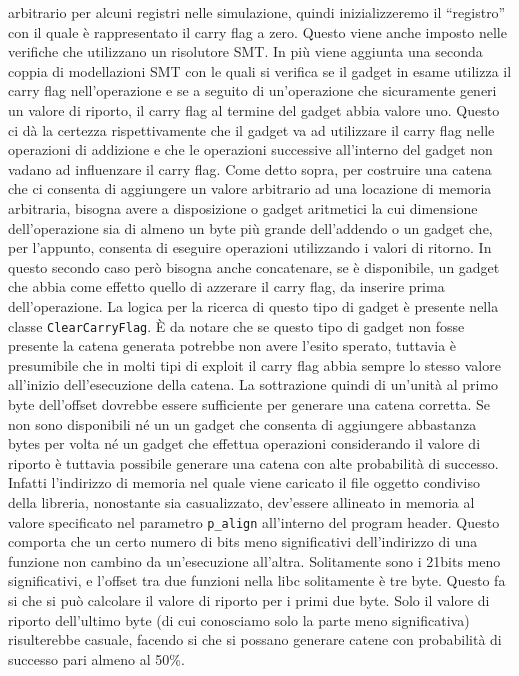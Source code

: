 arbitrario per alcuni registri nelle simulazione, quindi
inizializzeremo il ``registro'' con il quale è rappresentato il carry
flag a zero. Questo viene anche imposto nelle verifiche che utilizzano
un risolutore SMT. In più viene aggiunta una seconda coppia di
modellazioni SMT con le quali si verifica se il gadget in esame
utilizza il carry flag nell'operazione e se a seguito di un'operazione
che sicuramente generi un valore di riporto, il carry flag al termine
del gadget abbia valore uno. Questo ci dà la certezza rispettivamente
che il gadget va ad utilizzare il carry flag nelle operazioni di
addizione e che le operazioni successive all'interno del gadget non
vadano ad influenzare il carry flag. Come detto sopra, per costruire
una catena che ci consenta di aggiungere un valore arbitrario ad una
locazione di memoria arbitraria, bisogna avere a disposizione o gadget
aritmetici la cui dimensione dell'operazione sia di almeno un byte più
grande dell'addendo o un gadget che, per l'appunto, consenta di
eseguire operazioni utilizzando i valori di ritorno. In questo secondo
caso però bisogna anche concatenare, se è disponibile, un gadget che
abbia come effetto quello di azzerare il carry flag, da inserire prima
dell'operazione. La logica per la ricerca di questo tipo di gadget è
presente nella classe \lstinline{ClearCarryFlag}. È da notare che se
questo tipo di gadget non fosse presente la catena generata potrebbe
non avere l'esito sperato, tuttavia è presumibile che in molti tipi di
exploit il carry flag abbia sempre lo stesso valore all'inizio
dell'esecuzione della catena. La sottrazione quindi di un'unità al
primo byte dell'offset dovrebbe essere sufficiente per generare una
catena corretta. Se non sono disponibili né un un gadget che consenta
di aggiungere abbastanza bytes per volta né un gadget che effettua
operazioni considerando il valore di riporto è tuttavia possibile
generare una catena con alte probabilità di successo. Infatti
l'indirizzo di memoria nel quale viene caricato il file oggetto
condiviso della libreria, nonostante sia casualizzato, dev'essere
allineato in memoria al valore specificato nel parametro
\lstinline{p_align} all'interno del program header. Questo comporta
che un certo numero di bits meno significativi dell'indirizzo di una
funzione non cambino da un'esecuzione all'altra. Solitamente sono i
21bits meno significativi, e l'offset tra due funzioni nella libc
solitamente è tre byte. Questo fa si che si può calcolare il valore di
riporto per i primi due byte. Solo il valore di riporto dell'ultimo
byte (di cui conosciamo solo la parte meno significativa) risulterebbe
casuale, facendo si che si possano generare catene con probabilità di
successo pari almeno al 50\%.


